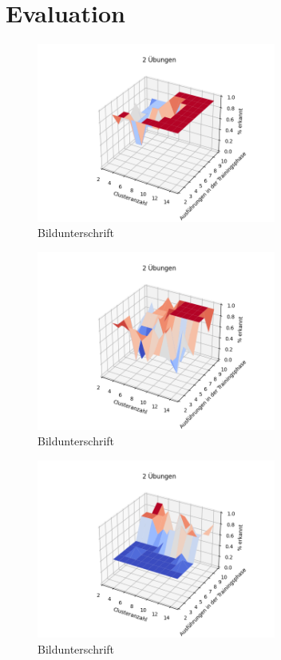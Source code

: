 \documentclass{article}
\begin{document}
\section{Evaluation}
\begin{figure}[h]
\centering
\label{fig:neuron}
\includegraphics[width=0.7\textwidth]{figures/2_graph.png}
\caption{Bildunterschrift}
\end{figure}
\begin{figure}[h]
\centering
\label{fig:neuron}
\includegraphics[width=0.7\textwidth]{figures/3_graph.png}
\caption{Bildunterschrift}
\end{figure}
\begin{figure}[h]
\centering
\label{fig:neuron}
\includegraphics[width=0.7\textwidth]{figures/4_graph.png}
\caption{Bildunterschrift}
\end{figure}
\end{document}
